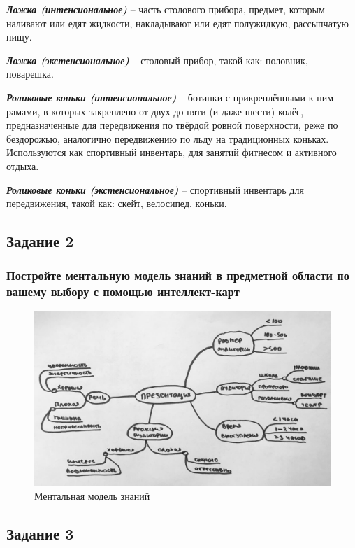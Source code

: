 \documentclass[14pt,a4paper,report]{report}
\begin{document}
\emph{\textbf{Ложка (интенсиональное)}} -- часть столового прибора, предмет, которым наливают или едят жидкости, накладывают или едят полужидкую, рассыпчатую пищу.

\emph{\textbf{Ложка (экстенсиональное)}} -- столовый прибор, такой как: половник, поварешка.

\emph{\textbf{Роликовые коньки (интенсиональное)}} -- ботинки с прикреплёнными к ним рамами, в которых закреплено от двух до пяти (и даже шести) колёс, предназначенные для передвижения по твёрдой ровной поверхности, реже по бездорожью, аналогично передвижению по льду на традиционных коньках. Используются как спортивный инвентарь, для занятий фитнесом и активного отдыха.

\emph{\textbf{Роликовые коньки (экстенсиональное)}} -- спортивный инвентарь для передвижения, такой как: скейт, велосипед, коньки.

\subsection{Задание 2}

\subsubsection{Постройте ментальную модель знаний в предметной области по вашему выбору с помощью интеллект-карт}

\begin{figure}[h!]
\centering
\includegraphics[scale = 0.35]{images/mindmap.jpg}
\caption{Ментальная модель знаний}
\label{image:1}
\end{figure}

\subsection{Задание 3}
\end{document}
